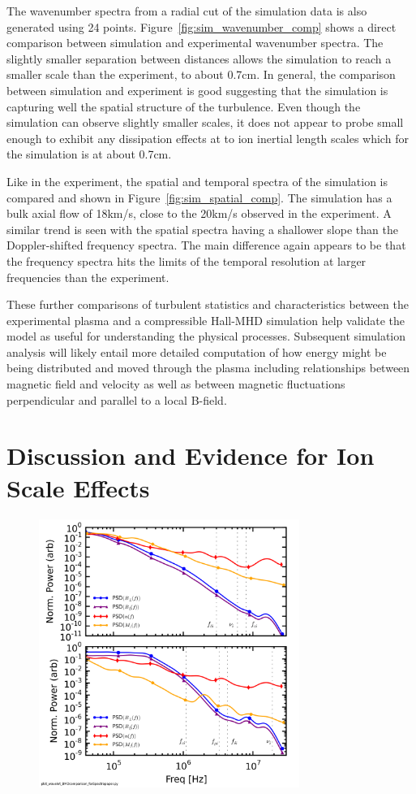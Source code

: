 \documentclass[aip,prl,amsmath,amssymb,reprint,superscriptaddress]{revtex4-1} %
\begin{document}
The wavenumber spectra from a radial cut of the simulation data is also generated using 24 points. Figure~\ref{fig:sim_wavenumber_comp} shows a direct comparison between simulation and experimental wavenumber spectra. The slightly smaller separation between distances allows the simulation to reach a smaller scale than the experiment, to about 0.7cm. In general, the comparison between simulation and experiment is good suggesting that the simulation is capturing well the spatial structure of the turbulence. Even though the simulation can observe slightly smaller scales, it does not appear to probe small enough to exhibit any dissipation effects at to ion inertial length scales which for the simulation is at about 0.7cm.

Like in the experiment, the spatial and temporal spectra of the simulation is compared and shown in Figure~\ref{fig:sim_spatial_comp}. The simulation has a bulk axial flow of 18km/s, close to the 20km/s observed in the experiment. A similar trend is seen with the spatial spectra having a shallower slope than the Doppler-shifted frequency spectra. The main difference again appears to be that the frequency spectra hits the limits of the temporal resolution at larger frequencies than the experiment.

These further comparisons of turbulent statistics and characteristics between the experimental plasma and a compressible Hall-MHD simulation help validate the model as useful for understanding the physical processes. Subsequent simulation analysis will likely entail more detailed computation of how energy might be being distributed and moved through the plasma including relationships between magnetic field and velocity as well as between magnetic fluctuations perpendicular and parallel to a local B-field.

\section{Discussion and Evidence for Ion Scale Effects}

\begin{figure}[!htbp]
\centerline{
\includegraphics[width=8.5cm]{BvsDensvsFlowspec_1mWb_and_0mWbcomp_40t60us}}
\caption{\label{fig:BMD_comp}}
\end{figure}
\end{document}
